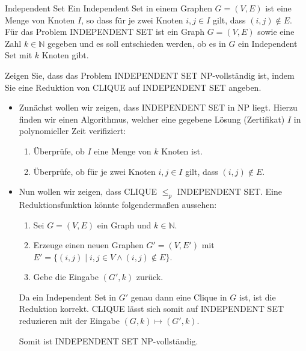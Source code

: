 \documentclass{article}
\begin{document}
\begin{exercise}{Independent Set}
  Ein Independent Set in einem Graphen $G = (V, E)$ ist eine Menge von Knoten $I$, so dass für je zwei Knoten $i, j \in I$ gilt, dass $(i, j) \notin E$. Für das Problem INDEPENDENT SET ist ein Graph $G = (V, E)$ sowie eine Zahl $k \in \mathbb{N}$ gegeben und es soll entschieden werden, ob es in $G$ ein Independent Set mit $k$ Knoten gibt.\par
  Zeigen Sie, dass das Problem INDEPENDENT SET NP-vollständig ist, indem Sie eine Reduktion von CLIQUE auf INDEPENDENT SET angeben.

  \begin{solution}
    \begin{itemize}
      \item Zunächst wollen wir zeigen, dass INDEPENDENT SET in NP liegt. Hierzu finden wir einen Algorithmus, welcher eine gegebene Lösung (Zertifikat) $I$ in polynomieller Zeit verifiziert:
            \begin{enumerate}
              \item Überprüfe, ob $I$ eine Menge von $k$ Knoten ist.
              \item Überprüfe, ob für je zwei Knoten $i, j \in I$ gilt, dass $(i, j) \notin E$.
            \end{enumerate}
      \item Nun wollen wir zeigen, dass CLIQUE $\leq_p$ INDEPENDENT SET. Eine Reduktionsfunktion könnte folgendermaßen aussehen:
            \begin{enumerate}
              \item Sei $G = (V, E)$ ein Graph und $k \in \mathbb{N}$.
              \item Erzeuge einen neuen Graphen $G' = (V, E')$ mit $E' = \{(i, j) \mid i, j \in V \land (i, j) \notin E\}$.
              \item Gebe die Eingabe $(G', k)$ zurück.
            \end{enumerate}
            Da ein Independent Set in $G'$ genau dann eine Clique in $G$ ist, ist die Reduktion korrekt. CLIQUE lässt sich somit auf INDEPENDENT SET reduzieren mit der Eingabe $(G, k) \mapsto (G', k)$.\par Somit ist INDEPENDENT SET NP-vollständig.
    \end{itemize}
  \end{solution}
\end{exercise}
\end{document}

